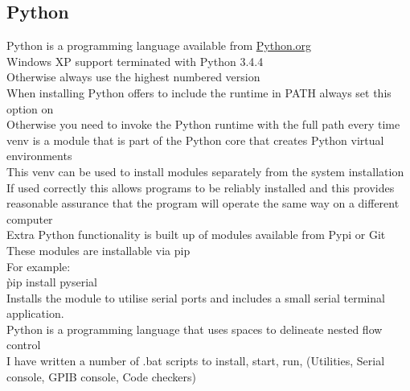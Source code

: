 \subsection{Python}
\label{sec:Python}
\gls{Python} is a programming language available from \href{https://python.org}{Python.org}\\

Windows XP support terminated with Python 3.4.4\\
Otherwise always use the highest numbered version\\

When installing Python offers to include the runtime in PATH always set this option on\\
Otherwise you need to invoke the Python runtime with the full path every time\\

\gls{venv} is a module that is part of the Python core that creates Python virtual environments\\
This venv can be used to install modules separately from the system installation\\
If used correctly this allows programs to be reliably installed and this provides reasonable assurance that the program will operate the same way on a different computer\\

Extra Python functionality is built up of modules available from \gls{Pypi} or \gls{Git}\\
These modules are installable via \gls{pip}\\

For example:\\
\`pip install pyserial\`\\
Installs the module to utilise serial ports and includes a small serial terminal application.\\

Python is a programming language that uses spaces to delineate nested flow control\\

I have written a number of .bat scripts to install, start, run, (Utilities, Serial console, GPIB console, Code checkers)\\
